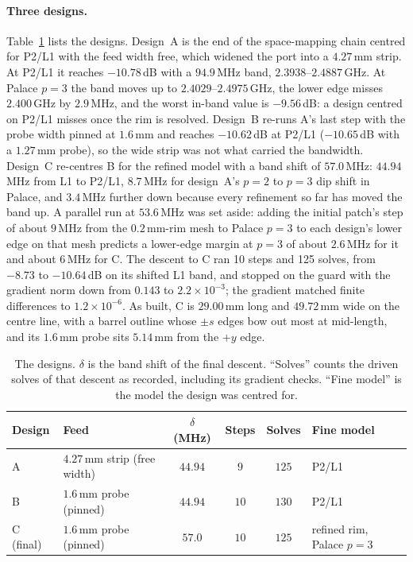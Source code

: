 \documentclass{anvil-paper}
\newcommand{\PL}{P2/L1}
\begin{document}
\paragraph{Three designs.}
Table~\ref{tab:chain} lists the designs. Design~A is the end of the
space-mapping chain centred for \PL{} with the feed width free, which widened
the port into a $4.27$\,mm strip. At \PL{} it reaches $-10.78$\,dB with a
$94.9$\,MHz band, $2.3938$--$2.4887$\,GHz. At Palace $p = 3$ the band moves
up to $2.4029$--$2.4975$\,GHz, the lower edge misses $2.400$\,GHz by
$2.9$\,MHz, and the worst in-band value is $-9.56$\,dB: a design centred on
\PL{} misses once the rim is resolved. Design~B re-runs A's last step with
the probe width pinned at $1.6$\,mm and reaches $-10.62$\,dB at \PL{}
($-10.65$\,dB with a $1.27$\,mm probe), so the wide strip was not what
carried the bandwidth. Design~C re-centres B for the refined model with a
band shift of $57.0$\,MHz: $44.94$\,MHz from L1 to \PL, $8.7$\,MHz for design~A's
$p = 2$ to $p = 3$ dip shift in Palace, and
$3.4$\,MHz further down because every refinement so far has moved the band
up. A parallel run at $53.6$\,MHz was set aside: adding the initial patch's
step of about $9$\,MHz from the $0.2$\,mm-rim mesh to Palace $p = 3$ to each
design's lower edge on that mesh predicts a lower-edge margin at $p = 3$ of
about $2.6$\,MHz for it and about $6$\,MHz for C. The descent to C ran 10 steps and 125 solves,
from $-8.73$ to $-10.64$\,dB on its shifted L1 band, and stopped on the guard
with the gradient norm down from $0.143$ to $2.2\times10^{-3}$; the gradient
matched finite differences to $1.2\times10^{-6}$. As built, C is
$29.00$\,mm long and $49.72$\,mm wide on the centre line, with a barrel
outline whose $\pm s$ edges bow out most at mid-length, and its $1.6$\,mm
probe sits $5.14$\,mm from the $+y$ edge.

\begin{table}[t]
  \centering
  \caption{The designs. $\delta$ is the band shift of the final descent.
  ``Solves'' counts the driven solves of that descent as recorded,
  including its gradient checks. ``Fine model'' is the model the design was
  centred for.}
  \label{tab:chain}
  \small
  \begin{tabular}{@{}l l c c c l@{}}
    \toprule
    Design & Feed & $\delta$ (MHz) & Steps & Solves & Fine model \\
    \midrule
    A & $4.27$\,mm strip (free width) & $44.94$ & $9$ & $125$ & \PL \\
    B & $1.6$\,mm probe (pinned) & $44.94$ & $10$ & $130$ & \PL \\
    C (final) & $1.6$\,mm probe (pinned) & $57.0$ & $10$ & $125$ & refined rim, Palace $p = 3$ \\
    \bottomrule
  \end{tabular}
\end{table}
\end{document}
